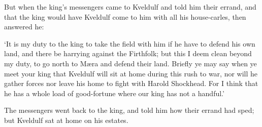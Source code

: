 But when the king's messengers came to Kveldulf and told him their errand, and that the king would have Kveldulf come to him with all his house-carles, then answered he:

`It is my duty to the king to take the field with him if he have to defend his own land, and there be harrying against the Firthfolk; but this I deem clean beyond my duty, to go north to M\ae ra and defend their land. Briefly ye may say when ye meet your king that Kveldulf will sit at home during this rush to war, nor will he gather forces nor leave his home to fight with Harold Shockhead. For I think that he has a whole load of good-fortune where our king has not a handful.'

The messengers went back to the king, and told him how their errand had sped; but Kveldulf sat at home on his estates.
